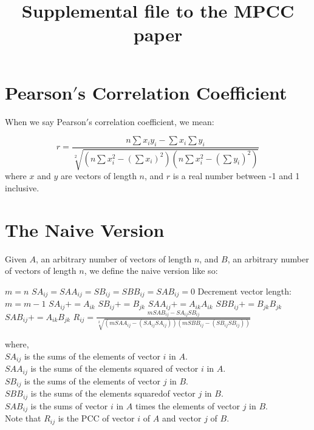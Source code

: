 \documentclass{bioinfo}
\begin{document}
\title[Supplemental file 1]{Supplemental file to the MPCC paper}

\section{Pearson$'$s Correlation Coefficient}
When we say Pearson$'$s correlation coefficient, we mean:

\begin{equation}
r=\frac{n\sum x_iy_i-\sum x_i\sum y_i}{ \sqrt[2]{(n\sum x_i^2-(\sum x_i)^2)(n\sum x_i^2-(\sum y_i)^2)}}
\end{equation}
where $x$ and $y$ are vectors of length $n$, and $r$ is a real number between -1 and 1 inclusive.

\section{The Naive Version}

Given $A$, an arbitrary number of vectors of length $n$, and $B$, an arbitrary number of vectors of length $n$, 
we define the naive version like so:

\begin{algorithmic}[1]
    \STATE $m=n$
    \STATE $SA_{ij}=SAA_{ij}=SB_{ij}=SBB_{ij}=SAB_{ij}=0$
        \STATE Decrement vector length: $m=m-1$
      \ELSE
        \STATE $SA_{ij}+=A_{ik}$
        \STATE $SB_{ij}+=B_{jk}$
        \STATE $SAA_{ij}+=A_{ik}A_{ik}$
        \STATE $SBB_{ij}+=B_{jk}B_{jk}$
        \STATE $SAB_{ij}+=A_{ik}B_{jk}$
      \ENDIF
    \ENDFOR 
    \STATE $R_{ij}=\frac{mSAB_{ij}-SA_{ij}SB_{ij}}{ \sqrt[2]{(mSAA_{ij}-(SA_{ij}SA_{ij}))(mSBB_{ij}-(SB_{ij}SB_{ij}))}}$
  \ENDFOR
\ENDFOR
\end{algorithmic}

\noindent where,\\ 
$SA_{ij}$ is the sums of the elements of vector $i$ in $A$.\\
$SAA_{ij}$ is the sums of the elements squared of vector $i$ in $A$.\\
$SB_{ij}$ is the sums of the elements of vector $j$ in $B$.\\
$SBB_{ij}$ is the sums of the elements squaredof vector $j$ in $B$.\\
$SAB_{ij}$ is the sums of vector $i$ in $A$ times the elements of vector $j$ in $B$.\\
Note that $R_{ij}$ is the PCC of vector $i$ of $A$ and vector $j$ of $B$.
\end{document}
